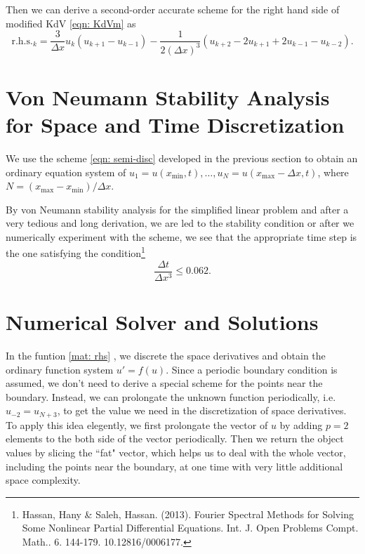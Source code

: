\documentclass{assignment}[2019/10/15]
\begin{document}
    Then we can derive a second-order accurate scheme for the right hand side of modified KdV \ref{eqn: KdVm} as
    \begin{equation}\label{eqn: semi-disc}
        \text{r.h.s.}_k = \frac3{\Delta x}u_k(u_{k+1}-u_{k-1}) - \frac{1}{2(\Delta x)^3}(u_{k+2}-2u_{k+1}+2u_{k-1}-u_{k-2}).
    \end{equation}

    \section{Von Neumann Stability Analysis for Space and Time Discretization}

    We use the scheme \ref{eqn: semi-disc} developed in the previous section to obtain an ordinary equation system of $u_1=u(x_{\text{min}}, t), \dotsc, u_N = u(x_{\text{max}}-\Delta x, t)$, where $N = (x_{\text{max}}-x_{\text{min}})/\Delta x$.

    By von Neumann stability analysis for the simplified linear problem and after a very tedious and long derivation, we are led to the stability condition or
    after we numerically experiment with the scheme, we see that the appropriate time
    step is the one satisfying the condition\footnote{Hassan, Hany \& Saleh, Hassan. (2013). Fourier Spectral Methods for Solving Some Nonlinear Partial Differential Equations. Int. J. Open Problems Compt. Math.. 6. 144-179. 10.12816/0006177.}
    \begin{equation}
        \frac{\Delta t}{\Delta x^3} \leq 0.062.
    \end{equation}

    \section{Numerical Solver and Solutions}

    In the funtion \ref{mat: rhs} , we discrete the space derivatives and obtain the ordinary function system $u'=f(u)$. Since a periodic boundary condition is assumed, we don't need to derive a special scheme for the points near the boundary. Instead, we can prolongate the unknown function periodically, i.e. $u_{-2}=u_{N+3}$, to get the value we need in the discretization of space derivatives. To apply this idea elegently, we first prolongate the vector of $u$ by adding $p=2$ elements to the both side of the vector periodically. Then we return the object values by slicing the ``fat" vector, which helps us to deal with the whole vector, including the points near the boundary, at one time with very little additional space complexity.
\end{document}
